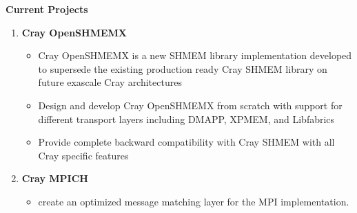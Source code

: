 \textbf{Current Projects}
\begin{enumerate}
\setcounter{enumi}{0}
\item \textbf{Cray OpenSHMEMX}
    \begin{itemize}
        \item Cray OpenSHMEMX is a new SHMEM library implementation developed to
        supersede the existing production ready Cray SHMEM library on future
        exascale Cray architectures
        \item Design and develop Cray OpenSHMEMX from scratch with support for
        different transport layers including DMAPP, XPMEM, and Libfabrics
        \item Provide complete backward compatibility with Cray SHMEM with all
        Cray specific features
    \end{itemize}

\item \textbf{Cray MPICH}
    \begin{itemize}
        \item create an optimized message matching layer for the MPI
        implementation.
    \end{itemize}
\end{enumerate}

